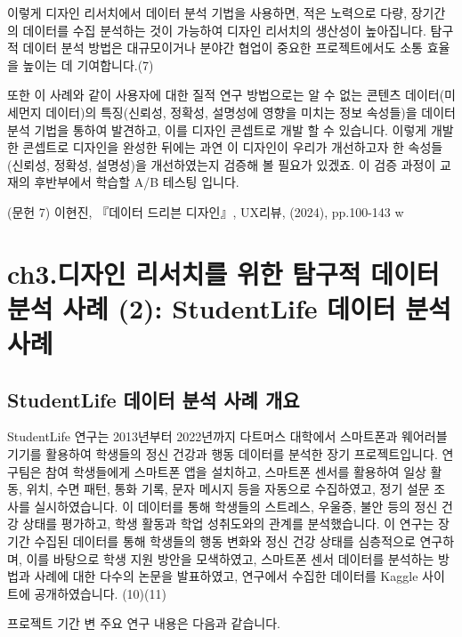 \documentclass[
  letterpaper,
]{book}
\begin{document}
이렇게 디자인 리서치에서 데이터 분석 기법을 사용하면, 적은 노력으로
다량, 장기간의 데이터를 수집 분석하는 것이 가능하여 디자인 리서치의
생산성이 높아집니다. 탐구적 데이터 분석 방법은 대규모이거나 분야간
협업이 중요한 프로젝트에서도 소통 효율을 높이는 데 기여합니다.(7)

또한 이 사례와 같이 사용자에 대한 질적 연구 방법으로는 알 수 없는 콘텐츠
데이터(미세먼지 데이터)의 특징(신뢰성, 정확성, 설명성에 영향을 미치는
정보 속성들)을 데이터 분석 기법을 통하여 발견하고, 이를 디자인 콘셉트로
개발 할 수 있습니다. 이렇게 개발한 콘셉트로 디자인을 완성한 뒤에는 과연
이 디자인이 우리가 개선하고자 한 속성들(신뢰성, 정확성, 설명성)을
개선하였는지 검증해 볼 필요가 있겠죠. 이 검증 과정이 교재의 후반부에서
학습할 A/B 테스팅 입니다.

(문헌 7) 이현진, 『데이터 드리븐 디자인』, UX리뷰, (2024), pp.100-143 w

\chapter{ch3.디자인 리서치를 위한 탐구적 데이터 분석 사례 (2):
StudentLife 데이터 분석
사례}\label{ch3.uxb514uxc790uxc778-uxb9acuxc11cuxce58uxb97c-uxc704uxd55c-uxd0d0uxad6cuxc801-uxb370uxc774uxd130-uxbd84uxc11d-uxc0acuxb840-2-studentlife-uxb370uxc774uxd130-uxbd84uxc11d-uxc0acuxb840}

\section{StudentLife 데이터 분석 사례
개요}\label{studentlife-uxb370uxc774uxd130-uxbd84uxc11d-uxc0acuxb840-uxac1cuxc694}

StudentLife 연구는 2013년부터 2022년까지 다트머스 대학에서 스마트폰과
웨어러블 기기를 활용하여 학생들의 정신 건강과 행동 데이터를 분석한 장기
프로젝트입니다. 연구팀은 참여 학생들에게 스마트폰 앱을 설치하고,
스마트폰 센서를 활용하여 일상 활동, 위치, 수면 패턴, 통화 기록, 문자
메시지 등을 자동으로 수집하였고, 정기 설문 조사를 실시하였습니다. 이
데이터를 통해 학생들의 스트레스, 우울증, 불안 등의 정신 건강 상태를
평가하고, 학생 활동과 학업 성취도와의 관계를 분석했습니다. 이 연구는
장기간 수집된 데이터를 통해 학생들의 행동 변화와 정신 건강 상태를
심층적으로 연구하며, 이를 바탕으로 학생 지원 방안을 모색하였고, 스마트폰
센서 데이터를 분석하는 방법과 사례에 대한 다수의 논문을 발표하였고,
연구에서 수집한 데이터를 Kaggle 사이트에 공개하였습니다. (10)(11)

프로젝트 기간 변 주요 연구 내용은 다음과 같습니다.
\end{document}
